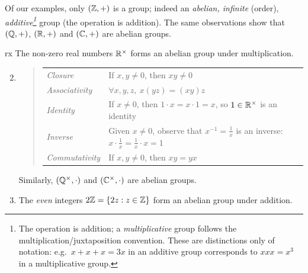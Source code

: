 Of our examples, only $(\mathbb{Z},+)$ is a group; indeed an \emph{abelian, infinite} (order), \emph{additive\footnote{\label{fn:additive}The operation is addition; a \emph{multiplicative} group follows the multiplication/juxtaposition convention. These are distinctions only of notation: e.g.\ $x+x+x=3x$ in an additive group corresponds to $xxx=x^3$ in a multiplicative group.}} group (the operation is addition). The same observations show that $(\mathbb{Q},+)$, $(\mathbb{R},+)$ and $(\mathbb{C},+)$ are abelian groups.


\begin{examples}{}{rx}
\exstart The non-zero real numbers $\mathbb{R}^\times$ forms an abelian group under multiplication.\vspace{-3pt}
\begin{enumerate}\setcounter{enumi}{1}\itemsep0pt
  \item[]\begin{quote}\renewcommand{\arraystretch}{1.1}
		\begin{tabular}{@{}ll}
			\emph{Closure}&If $x,y\neq 0$, then $xy\neq 0$\\
			\emph{Associativity}&$\forall x,y,z,\ x(yz)=(xy)z$\\
			\emph{Identity}&If $x\neq 0$, then $1\cdot x=x\cdot 1=x$, so $1\in\mathbb{R}^\times$ is an identity\\
			\emph{Inverse}&Given $x\neq 0$, observe that $x^{-1}=\frac 1x$ is an inverse: $x\cdot \frac 1x=\frac 1x\cdot x=1$\\
			\emph{Commutativity}&If $x,y\neq 0$, then $xy=yx$
		\end{tabular}
	\end{quote}
	Similarly, $(\mathbb{Q}^\times,\cdot)$ and $(\mathbb{C}^\times,\cdot)$ are abelian groups.
	
	  
  \item The \emph{even} integers $2\mathbb{Z}=\{2z:z\in\mathbb{Z}\}$ form an abelian group under addition.
  

\end{enumerate}
\end{examples}
